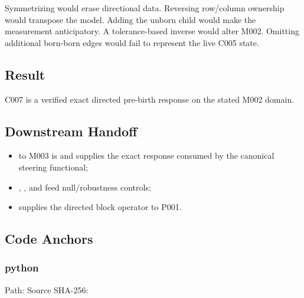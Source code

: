 Symmetrizing would erase directional data. Reversing row/column
ownership would transpose the model. Adding the unborn child would make
the measurement anticipatory. A tolerance-based inverse would alter
M002. Omitting additional born-born edges would fail to represent the
live C005 state.

\subsection{Result}\label{result-20}

C007 is a verified exact directed pre-birth response on the stated M002
domain.

\subsection{Downstream Handoff}\label{downstream-handoff-20}

\begin{itemize}
\tightlist
\item
  \texttt{\protect{}} to M003 is \texttt{\protect{}} and supplies the
  exact response consumed by the canonical steering functional;
\item
  \texttt{\protect{}}, \texttt{\protect{}}, and \texttt{\protect{}} feed null/robustness
  controls;
\item
  \texttt{\protect{}} supplies the directed block operator to P001.
\end{itemize}

\subsection{Code Anchors}\label{code-anchors-13}

\subsubsection{python}\label{python-7}

Path:
Source SHA-256:
\texttt{\protect{}}

